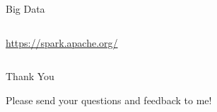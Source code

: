 \documentclass[10pt]{beamer}
\begin{document}
\begin{frame}{Big Data}
\begin{columns}
\begin{column}[T]{0.48\textwidth}
\begin{overprint}
            \centerline{\footnotesize \url{https://spark.apache.org/}}
          \end{overprint}
        \end{column}   
      \end{columns}
    \end{frame}

    \begin{frame}{Thank You}
      \centerline{\large Please send your questions and feedback to me!}
    \end{frame}
\end{document}
